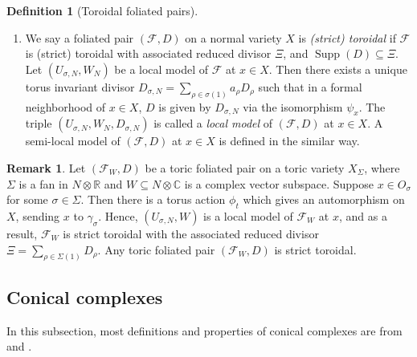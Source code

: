 \documentclass[12pt,reqno]{amsart}
\theoremstyle{definition}
\newtheorem{definition}[theorem]{Definition}
\newtheorem{remark}[theorem]{Remark}
\newcommand{\mc}{\mathcal}
\newcommand{\on}{\operatorname}
\newcommand\cF{{\mathcal{F}}}
\newcommand\bC{{\mathbb C}}
\newcommand\bR{{\mathbb R}}
\begin{document}
\begin{definition}[Toroidal foliated pairs]
\begin{enumerate}
    \item
    We say a foliated pair $(\cF,D)$ on a normal variety $X$ is \emph{(strict) toroidal} if $\mc F$ is (strict) toroidal with associated reduced divisor $\Xi$, and $\on{Supp}(D)\subseteq \Xi$. 
    Let $(U_{\sigma,N},W_N)$ be a local model of $\mc F$ at $x\in X$. Then there exists a unique torus invariant divisor $D_{\sigma,N} = \sum_{\rho\in\sigma(1)} a_\rho D_\rho$ such that in a formal neighborhood of $x\in X$, $D$ is given by $D_{\sigma,N}$ via the isomorphism $\psi_x$. 
    The triple $(U_{\sigma,N},W_N,D_{\sigma,N})$ is called a \emph{local model} of $(\cF,D)$ at $x\in X$. 
    A semi-local model of $(\cF,D)$ at $x\in X$ is defined in the similar way. 
    \end{enumerate}
\end{definition}



\begin{remark}\label{toroidal_pair_rmk}
    Let $(\cF_W,D)$ be a toric foliated pair on a toric variety $X_\Sigma$, where $\Sigma$ is a fan in $N\otimes\bR$ and $W\subseteq N\otimes\bC$ is a complex vector subspace.
    Suppose $x\in O_\sigma$ for some $\sigma\in\Sigma$. Then there is a torus action $\phi_t$ which gives an automorphism on $X$, sending $x$ to $\gamma_{\sigma}$. Hence, $(U_{\sigma,N},W)$ is a local model of $\cF_W$ at $x$, and as a result, 
    $\cF_W$ is strict toroidal with the associated reduced divisor $\Xi=\sum_{\rho\in\Sigma(1)}D_\rho$. Any toric foliated pair $(\mc F_W,D)$ is strict toroidal.
\end{remark}




\subsection{Conical complexes}\label{sec:conical_cplx}
In this subsection, most definitions and properties of conical complexes are from \cite{KKMS1973toroidal} and \cite{AK00}. 
\end{document}

